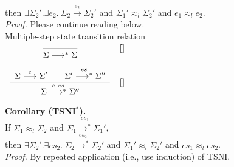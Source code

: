 \documentclass{article}
\makeatletter
\newcommand{\startrules}{\begin{array}{l@{~{,}~}lcl@{~{,}~}l|ll}}
\newcommand{\finishrules}{\end{array}}
\newcommand{\rn}[1]{\text{\textsc{[#1]}}}
\newcommand{\mrule}[3]{%
      \multicolumn{6}{c}{
        \dfrac{
          \begin{array}{c}
            #2
          \end{array}
        }{#3}
      }
    &
      \rn{#1}
  \\
      \multicolumn{7}{c}{}
  \\%
}
\newcommand{\ssteparrow}[1]{\overset{#1}{\longrightarrow}}
\newcommand{\ssteparrowstar}[1]{\overset{#1}{\longrightarrow^*}}
\newcommand{\sstep}[3]{#2\ssteparrow{#1}#3}
\newcommand{\sstepstar}[3]{#2\ssteparrowstar{#1}#3}
\newcommand{\lequiv}[3]{#2\approx_{#1}#3}
\makeatother
\begin{document}
\\
then $\exists \Sigma_2'.\exists e_2.~\sstep{e_2}{\Sigma_2}{\Sigma_2'}$
and $\lequiv{l}{\Sigma_1'}{\Sigma_2'}$
and $\lequiv{l}{e_1}{e_2}$.
\\
\textit{Proof.}
Please continue reading below.
\\
\fbox{$\sstepstar{es}{\Sigma}{\Sigma}$} Multiple-step state transition relation
\\
$\startrules
  \mrule{}{
  }{
    \sstepstar{}{\Sigma}{\Sigma}
  }
  \mrule{}{
      \sstep{e}{\Sigma}{\Sigma'}
    \qquad
      \sstepstar{es}{\Sigma'}{\Sigma''}
  }{
    \sstepstar{e~es}{\Sigma}{\Sigma''}
  }
\finishrules$
\\
\textbf{Corollary (TSNI${}^*$).}
\\
If $\lequiv{l}{\Sigma_1}{\Sigma_2}$
and $\sstepstar{es_1}{\Sigma_1}{\Sigma_1'}$,
\\
then $\exists \Sigma_2'.\exists es_2.~\sstepstar{es_2}{\Sigma_2}{\Sigma_2'}$
and $\lequiv{l}{\Sigma_1'}{\Sigma_2'}$
and $\lequiv{l}{es_1}{es_2}$.
\\
\textit{Proof.}
By repeated application (i.e., use induction) of TSNI.
\end{document}
